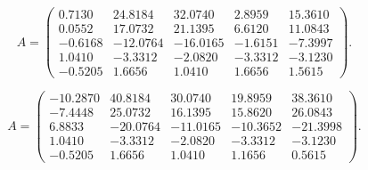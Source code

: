 \documentclass{ximera}
\begin{document}
\begin{exercise} \label{c14.5.2c}
\begin{equation*}
A=\left(\begin{array}{rrrrr}
    0.7130  & 24.8184  & 32.0740  &  2.8959  & 15.3610\\
    0.0552  & 17.0732  & 21.1395  &  6.6120  & 11.0843\\
   -0.6168  &-12.0764  &-16.0165  & -1.6151  & -7.3997\\
    1.0410  & -3.3312  & -2.0820  & -3.3312  & -3.1230\\
   -0.5205  &  1.6656  &  1.0410  &  1.6656  &  1.5615
\end{array}\right).
\end{equation*}
\end{exercise}

\begin{exercise} \label{c14.5.2d}
\begin{equation*}
A=\left(\begin{array}{rrrrr}
  -10.2870 &  40.8184 &  30.0740 &  19.8959 &  38.3610\\
   -7.4448 &  25.0732 &  16.1395 &  15.8620 &  26.0843\\
    6.8833 & -20.0764 & -11.0165 & -10.3652 & -21.3998\\
    1.0410 &  -3.3312 &  -2.0820 &  -3.3312 &  -3.1230\\
   -0.5205 &   1.6656 &   1.0410 &   1.1656 &   0.5615
\end{array}\right).
\end{equation*}
\end{exercise}
\end{document}
